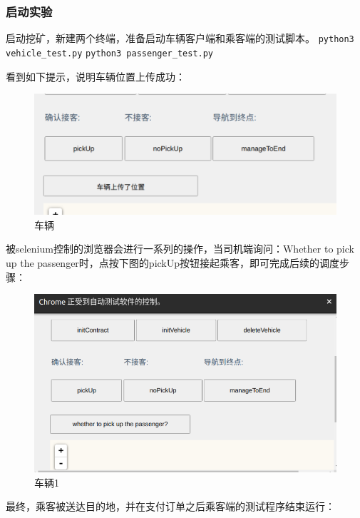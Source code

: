 \subsubsection{启动实验}

启动挖矿，新建两个终端，准备启动车辆客户端和乘客端的测试脚本。
\verb|python3 vehicle_test.py|
\verb|python3 passenger_test.py|

看到如下提示，说明车辆位置上传成功：

\begin{figure}
	\centering
	\includegraphics[width=\textwidth]{figures/车辆.png}
	\caption{车辆}
	\label{fig:车辆}
\end{figure}

被selenium控制的浏览器会进行一系列的操作，当司机端询问：Whether to pick up the passenger时，点按下图的pickUp按钮接起乘客，即可完成后续的调度步骤：

\begin{figure}
	\centering
	\includegraphics[width=\textwidth]{figures/车辆1.png}
	\caption{车辆1}
	\label{fig:车辆1}
\end{figure}

最终，乘客被送达目的地，并在支付订单之后乘客端的测试程序结束运行：

